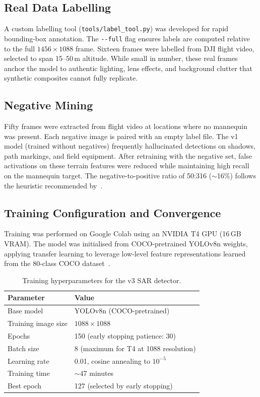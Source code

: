 \documentclass[10pt,a4paper]{article}
\begin{document}
\subsection{Real Data Labelling}

A custom labelling tool (\texttt{tools/label\_tool.py}) was developed for rapid bounding-box annotation. The \texttt{-{}-full} flag ensures labels are computed relative to the full $1456 \times 1088$ frame. Sixteen frames were labelled from DJI flight video, selected to span 15--50\,m altitude. While small in number, these real frames anchor the model to authentic lighting, lens effects, and background clutter that synthetic composites cannot fully replicate.

\subsection{Negative Mining}

Fifty frames were extracted from flight video at locations where no mannequin was present. Each negative image is paired with an empty label file. The v1 model (trained without negatives) frequently hallucinated detections on shadows, path markings, and field equipment. After retraining with the negative set, false activations on these terrain features were reduced while maintaining high recall on the mannequin target. The negative-to-positive ratio of 50:316 (${\sim}$16\%) follows the heuristic recommended by~\textcite{shrivastava2016training}.

\subsection{Training Configuration and Convergence}

Training was performed on Google Colab using an NVIDIA T4 GPU (16\,GB VRAM). The model was initialised from COCO-pretrained YOLOv8n weights, applying transfer learning to leverage low-level feature representations learned from the 80-class COCO dataset~\cite{lin2014coco}.

\begin{table}[ht]
  \centering
  \caption{Training hyperparameters for the v3 SAR detector.}\label{tab:training-config}
  \begin{tabular}{@{}ll@{}}
    \toprule
    \textbf{Parameter} & \textbf{Value} \\
    \midrule
    Base model & YOLOv8n (COCO-pretrained) \\
    Training image size & $1088 \times 1088$ \\
    Epochs & 150 (early stopping patience: 30) \\
    Batch size & 8 (maximum for T4 at 1088 resolution) \\
    Learning rate & 0.01, cosine annealing to $10^{-5}$ \\
    Training time & ${\sim}$47 minutes \\
    Best epoch & 127 (selected by early stopping) \\
    \bottomrule
  \end{tabular}
\end{table}
\end{document}
